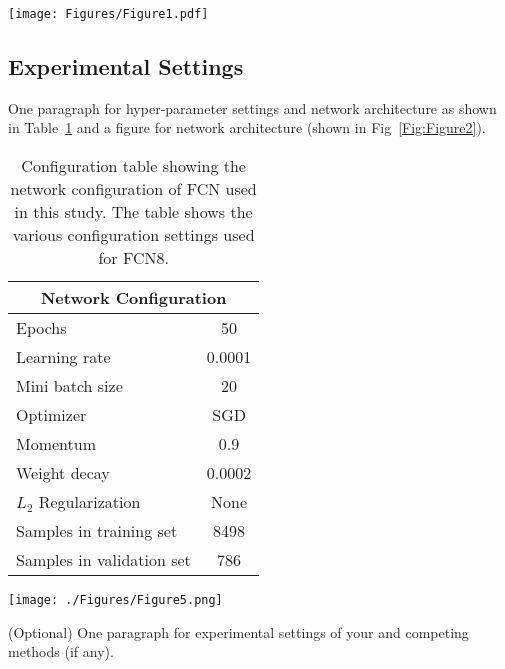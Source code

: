 \documentclass[conference]{IEEEtran}
\begin{document}
\begin{figure*}[!t]
\centering
\texttt{[image: Figures/Figure1.pdf]}
\caption{Figure showing the flowchart proposed for FCN-8 quantization and the comparison pipeline followed (for quantization technqiues, i.e., Direct Quantization, Llyod's Quantizer and $L_2$ error minimization) in the current study based on pixel accuracy, mean IOU, and mean accuracy.}
\label{Fig:Figure1}
\end{figure*}

\subsection{Experimental Settings}
One paragraph for hyper-parameter settings and network architecture as shown in Table~\ref{tab:FCNConfiguration} and a figure for network architecture (shown in Fig~\ref{Fig:Figure2}).

\begin{table}[!ht]
\centering
\caption{Configuration table showing the network configuration of FCN used in this study. The table shows the various configuration settings used for FCN8.}
\label{tab:FCNConfiguration} 
\begin{tabular}{|l|c|}
\hline
\multicolumn{2}{|c|}{\textbf{Network Configuration}} 
\\ \hline
Epochs & 50 \\
Learning rate & 0.0001 \\
Mini batch size & 20 \\ 
Optimizer & SGD \\
Momentum & 0.9 \\
Weight decay & 0.0002 \\
$L_2$ Regularization & None \\
Samples in training set & 8498 \\
Samples in validation set & 786 \\ \hline
\end{tabular}
\end{table}

\begin{figure*}[!ht]
\centerline{\texttt{[image: ./Figures/Figure5.png]}}
\caption{Sample network architecture image. Make it in Powerpoint with svg images and save as pdf. Sanity check: Zoom in and pixels should not break.}
\label{Fig:Figure2}
\end{figure*}

(Optional) One paragraph for experimental settings of your and competing methods (if any).
\end{document}
